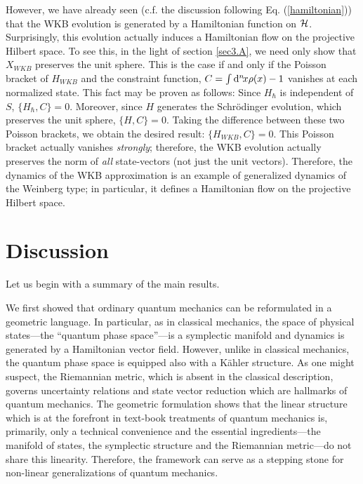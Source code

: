 However, we have already seen (c.f. the discussion following
Eq. (\ref{hamiltonian})) that the WKB evolution is generated by a
Hamiltonian function on ${\cal H}$. Surprisingly, this evolution actually
induces a Hamiltonian flow on the projective Hilbert space.  To see
this, in the light of section \ref{sec3.A}, we need only show that
$X_{WKB}$ preserves the unit sphere.  This is the case if and only if
the Poisson bracket of $H_{WKB}$ and the constraint function, $C =
\int {\mathrm d}^n \!x \rho(x) -1$ vanishes at each normalized state. This fact
may be proven as follows: Since $H_{\hbar}$ is independent of $S$,
$\{H_\hbar, C \} = 0$.  Moreover, since $H$ generates the
Schr\"odinger evolution, which preserves the unit sphere, $\{H,
C\}=0$.  Taking the difference between these two Poisson brackets, we
obtain the desired result: $\{H_{WKB}, C\} = 0$.  This Poisson bracket
actually vanishes {\em strongly}; therefore, the WKB evolution
actually preserves the norm of {\em all} state-vectors (not just the
unit vectors).  Therefore, the dynamics of the WKB approximation is an
example of generalized dynamics of the Weinberg type; in particular,
it defines a Hamiltonian flow on the projective Hilbert space.


\section{Discussion}

Let us begin with a summary of the main results. 

We first showed that ordinary quantum mechanics can be reformulated in
a geometric language.  In particular, as in classical mechanics, the
space of physical states---the ``quantum phase space''---is a
symplectic manifold and dynamics is generated by a Hamiltonian vector
field. However, unlike in classical mechanics, the quantum phase space
is equipped also with a K\"ahler structure. As one might suspect, the
Riemannian metric, which is absent in the classical description,
governs uncertainty relations and state vector reduction which are
hallmarks of quantum mechanics. The geometric formulation shows that
the linear structure which is at the forefront in text-book treatments
of quantum mechanics is, primarily, only a technical convenience and
the essential ingredients---the manifold of states, the symplectic
structure and the Riemannian metric---do not share this
linearity. Therefore, the framework can serve as a stepping stone
for non-linear generalizations of quantum mechanics.

